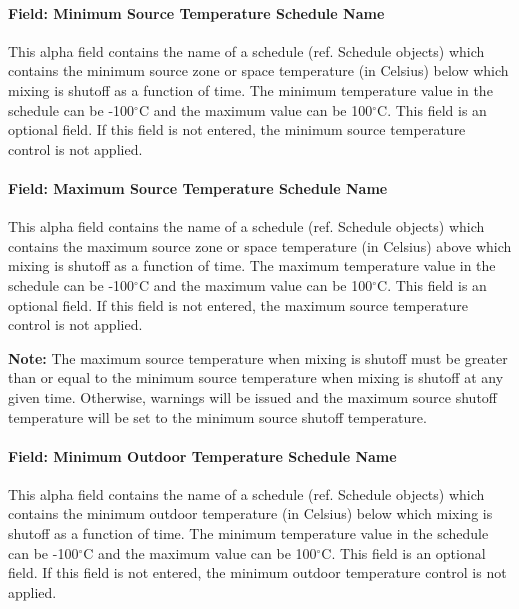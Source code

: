 \paragraph{Field: Minimum Source Temperature Schedule Name}\label{field-minimum-source-zone-temperature-schedule-name}

This alpha field contains the name of a schedule (ref. Schedule objects) which contains the minimum source zone or space temperature (in Celsius) below which mixing is shutoff as a function of time. The minimum temperature value in the schedule can be -100$^\circ$C and the maximum value can be 100$^\circ$C. This field is an optional field. If this field is not entered, the minimum source temperature control is not applied.

\paragraph{Field: Maximum Source Temperature Schedule Name}\label{field-maximum-source-zone-temperature-schedule-name}

This alpha field contains the name of a schedule (ref. Schedule objects) which contains the maximum source zone or space temperature (in Celsius) above which mixing is shutoff as a function of time. The maximum temperature value in the schedule can be -100$^\circ$C and the maximum value can be 100$^\circ$C. This field is an optional field. If this field is not entered, the maximum source temperature control is not applied.

\textbf{Note:} The maximum source temperature when mixing is shutoff must be greater than or equal to the minimum source temperature when mixing is shutoff at any given time. Otherwise, warnings will be issued and the maximum source shutoff temperature will be set to the minimum source shutoff temperature.

\paragraph{Field: Minimum Outdoor Temperature Schedule Name}\label{field-minimum-outdoor-temperature-schedule-name-2}

This alpha field contains the name of a schedule (ref. Schedule objects) which contains the minimum outdoor temperature (in Celsius) below which mixing is shutoff as a function of time. The minimum temperature value in the schedule can be -100$^\circ$C and the maximum value can be 100$^\circ$C. This field is an optional field. If this field is not entered, the minimum outdoor temperature control is not applied.


